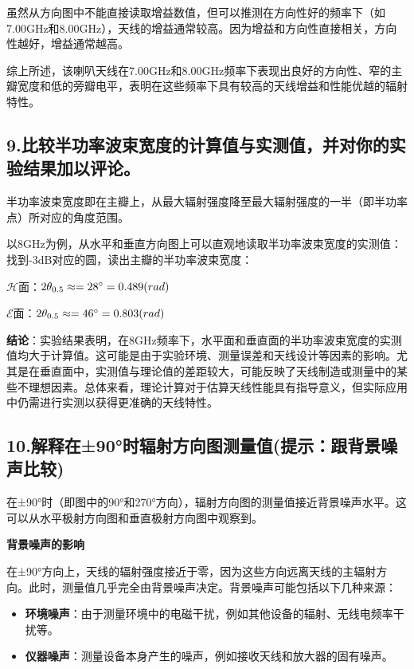 \documentclass[12pt,hyperref,a4paper,UTF8]{ctexart}
\begin{document}
虽然从方向图中不能直接读取增益数值，但可以推测在方向性好的频率下（如7.00GHz和8.00GHz），天线的增益通常较高。因为增益和方向性直接相关，方向性越好，增益通常越高。

综上所述，该喇叭天线在7.00GHz和8.00GHz频率下表现出良好的方向性、窄的主瓣宽度和低的旁瓣电平，表明在这些频率下具有较高的天线增益和性能优越的辐射特性。


\subsection*{9.比较半功率波束宽度的计算值与实测值，并对你的实验结果加以评论。}

半功率波束宽度即在主瓣上，从最大辐射强度降至最大辐射强度的一半（即半功率点）所对应的角度范围。

以8GHz为例，从水平和垂直方向图上可以直观地读取半功率波束宽度的实测值：找到-3dB对应的圆，读出主瓣的半功率波束宽度：

${\mathcal{H}}$面：$2\theta_{0.5}\approx=28\degree=0.489(rad)$

${\mathcal{E}}$面：$2\theta_{0.5}\approx=46\degree=0.803(rad)$

\textbf{结论}：实验结果表明，在8GHz频率下，水平面和垂直面的半功率波束宽度的实测值均大于计算值。这可能是由于实验环境、测量误差和天线设计等因素的影响。尤其是在垂直面中，实测值与理论值的差距较大，可能反映了天线制造或测量中的某些不理想因素。总体来看，理论计算对于估算天线性能具有指导意义，但实际应用中仍需进行实测以获得更准确的天线特性。



\subsection*{10.解释在±90°时辐射方向图测量值(提示：跟背景噪声比较)}

在±90°时（即图中的90°和270°方向），辐射方向图的测量值接近背景噪声水平。这可以从水平极射方向图和垂直极射方向图中观察到。

\textbf{背景噪声的影响}

在±90°方向上，天线的辐射强度接近于零，因为这些方向远离天线的主辐射方向。此时，测量值几乎完全由背景噪声决定。背景噪声可能包括以下几种来源：
\begin{itemize}
    \item \textbf{环境噪声}：由于测量环境中的电磁干扰，例如其他设备的辐射、无线电频率干扰等。
    \item \textbf{仪器噪声}：测量设备本身产生的噪声，例如接收天线和放大器的固有噪声。
\end{itemize}
\end{document}
